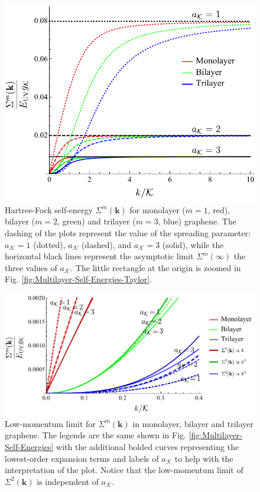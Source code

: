 \documentclass[english,aps,prd,nofootinbib,twocolumn]{revtex4-1}
\begin{document}
\begin{figure}[h]
\centering
\includegraphics[scale=0.6]{SelfEnergyPlot123.pdf}
\caption{Hartree-Fock self-energy $\Sigma^{m}(\mathbf{k})$ for monolayer ($m=1$, red), bilayer ($m=2$, green) and trilayer ($m=3$, blue) graphene. The dashing of the plots represent the value of the spreading parameter: $a_{\mathcal{K}}=1$ (dotted), $a_{\mathcal{K}}$ (dashed), and $a_{\mathcal{K}}=3$ (solid), while the horizontal black lines represent the asymptotic limit $\Sigma^{m}(\infty)$ the three values of $a_{\mathcal{K}}$. The little rectangle at the origin is zoomed in Fig. \ref{fig:Multilayer-Self-Energies-Taylor}.}
\label{fig:Multilayer-Self-Energies-Coulomb}

\end{figure}
\begin{figure}[h]
\centering
\includegraphics[scale=0.6]{SelfEnergyPlot123Taylor.pdf}
\caption{Low-momentum limit for $\Sigma^{m}(\mathbf{k})$ in monolayer, bilayer and trilayer graphene. The legends are the same shown in Fig. \ref{fig:Multilayer-Self-Energies} with the additional bolded curves representing the lowest-order expansion terms and labels of $a_{\mathcal{K}}$ to help with the interpretation of the plot. Notice that the low-momentum limit of $\Sigma^{2}(\mathbf{k})$ is independent of $a_{\mathcal{K}}$.}
\label{fig:Multilayer-Self-Energies-Taylor-Coulomb}
\end{figure}
\end{document}
